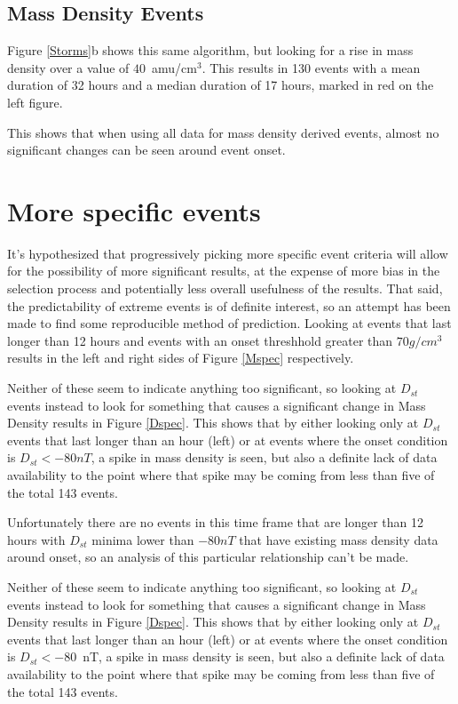 \documentclass[10pt,twocolumn]{article}
\begin{document}
\subsection{Mass Density Events}
Figure \ref{Storms}b shows this same algorithm, but looking for a rise in mass density over a value of $40$~amu/cm$^3$. This results in 130 events with a mean duration of 32 hours and a median duration of 17 hours, marked in red on the left figure.

This shows that when using all data for mass density derived events, almost no significant changes can be seen around event onset.

\section{More specific events}
It's hypothesized that progressively picking more specific event criteria will allow for the possibility of more significant results, at the expense of more bias in the selection process and potentially less overall usefulness of the results. That said, the predictability of extreme events is of definite interest, so an attempt has been made to find some reproducible method of prediction. Looking at events that last longer than 12 hours and events with an onset threshhold greater than $70g/cm^3$ results in the left and right sides of Figure \ref{Mspec} respectively.

Neither of these seem to indicate anything too significant, so looking at $D_{st}$ events instead to look for something that causes a significant change in Mass Density results in Figure \ref{Dspec}. This shows that by either looking only at $D_{st}$ events that last longer than an hour (left) or at events where the onset condition is $D_{st}<-80nT$, a spike in mass density is seen, but also a definite lack of data availability to the point where that spike may be coming from less than five of the total 143 events. 

Unfortunately there are no events in this time frame that are longer than 12 hours with $D_{st}$ minima lower than $-80nT$ that have existing mass density data around onset, so an analysis of this particular relationship can't be made.

Neither of these seem to indicate anything too significant, so looking at $D_{st}$ events instead to look for something that causes a significant change in Mass Density results in Figure \ref{Dspec}. This shows that by either looking only at $D_{st}$ events that last longer than an hour (left) or at events where the onset condition is $D_{st}<-80$~nT, a spike in mass density is seen, but also a definite lack of data availability to the point where that spike may be coming from less than five of the total 143 events. 
\end{document}
